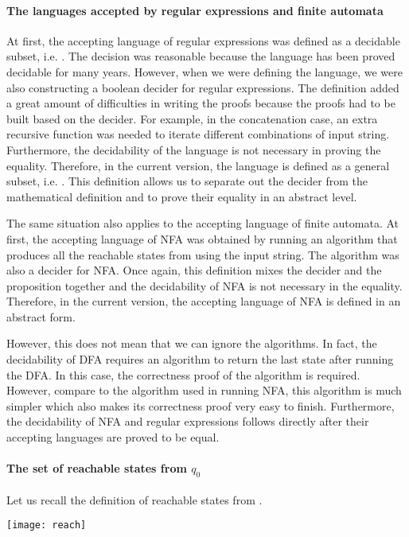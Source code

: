 \paragraph{The languages accepted by regular expressions and finite automata} At first, the
accepting language of regular expressions was defined as a decidable
subset, i.e. . The decision
was reasonable because the language has been proved decidable for many
years. However, when we were defining the language, we
were also constructing a boolean decider for regular
expressions. The definition added a great amount of
difficulties in writing the proofs because the proofs had to be built
based on the decider. For example, in the concatenation case, an extra recursive
function was needed to iterate different combinations of input
string. Furthermore, the decidability of the language is not
necessary in proving the equality. Therefore, in the current version, the language
is defined as a general subset, i.e. . This definition allows us to separate out the decider from
the mathematical definition and to prove their equality in an abstract level. 

\par The same situation also applies to the accepting language of finite automata. At first, the
accepting language of NFA was obtained by running an algorithm that
produces all the reachable states from \mb{q_0} using the input
string. The algorithm was also a decider for NFA. Once again, this
definition mixes the decider and the proposition together
and the decidability of NFA is not necessary in the equality. Therefore, in the current
version, the accepting language of NFA is defined in an abstract form. 

\par However, this does not mean that we can ignore the algorithms. In
fact, the decidability of DFA requires an algorithm to return the last
state after running the DFA. In this case, the correctness proof of the
algorithm is required. However, compare to the algorithm used in
running NFA, this algorithm is much simpler which also
makes its correctness proof very easy to finish. Furthermore, the
decidability of NFA and regular
expressions follows directly after their accepting languages are
proved to be equal. 

\paragraph{The set of reachable states from \(q_0\)} Let us recall the
definition of reachable states from \mb{q_0}. 
\begin{center} \texttt{[image: reach]} \end{center}

